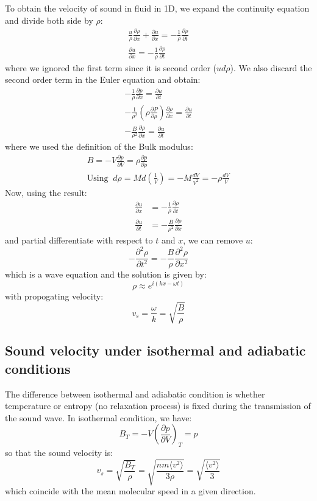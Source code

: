 \documentclass{article}
\newcommand{\pfrac}[2]{\frac{\partial #1}{\partial #2}}
\begin{document}
To obtain the velocity of sound in fluid in 1D, we expand the continuity equation and divide 
both side by $\rho$:
\begin{gather}
    \frac{u}{\rho} \pfrac{\rho}{x} + \pfrac{u}{x} = - \frac{1}{\rho} \pfrac{\rho}{t} \\ 
    \pfrac{u}{x} = - \frac{1}{\rho} \pfrac{\rho}{t}
\end{gather}
where we ignored the first term since it is second order ($u d\rho$). 
We also discard the second order term in the Euler equation and obtain:
\begin{gather}
    -\frac{1}{\rho} \frac{\partial p}{\partial x} = \frac{\partial u}{\partial t} \\
    - \frac{1}{\rho^2} \left( \rho \pfrac{P}{\rho} \right) \pfrac{\rho}{x} = \frac{\partial u}{\partial t} \\
    - \frac{B}{\rho^2} \pfrac{\rho}{x} = \frac{\partial u}{\partial t}
\end{gather}
where we used the definition of the Bulk modulus:
\begin{gather}
    B = -V \pfrac{p}{V} = \rho \pfrac{p}{\rho} \\
    \text{Using  } \ d\rho = M d\left( \frac{1}{V} \right) = - M \frac{dV}{V^2} = - \rho \frac{dV}{V}
\end{gather}
Now, using the result:
\begin{align}
    \pfrac{u}{x} &= - \frac{1}{\rho} \pfrac{\rho}{t} \\
    \frac{\partial u}{\partial t} &= - \frac{B}{\rho^2} \pfrac{\rho}{x}
\end{align}
and partial differentiate with respect to $t$ and $x$, we can remove $u$:
\begin{equation}
    - \frac{\partial^2 \rho}{\partial t^2} = - \frac{B}{\rho} \frac{\partial^2 \rho}{\partial x^2}
\end{equation}
which is a wave equation and the solution is given by:
\begin{equation}
    \rho \approx e^{i(kx-\omega t)}
\end{equation}
with propogating velocity:
\begin{equation}
    v_s = \frac{\omega}{k} = \sqrt{\frac{B}{\rho}}
\end{equation}

\subsection*{Sound velocity under isothermal and adiabatic conditions}
The difference between isothermal and adiabatic condition is whether temperature
or entropy (no relaxation process) is fixed during the transmission of the 
sound wave. In isothermal condition, we have:
\begin{equation}
    B_T = -V \left( \pfrac{p}{V} \right)_T = p
\end{equation}
so that the sound velocity is:
\begin{equation}
    v_s = \sqrt{\frac{B_T}{\rho}} = \sqrt{\frac{nm\langle v^2\rangle}{3\rho}} = \sqrt{\frac{\langle v^2\rangle}{3}}
\end{equation}
which coincide with the mean molecular speed in a given direction.
\end{document}
